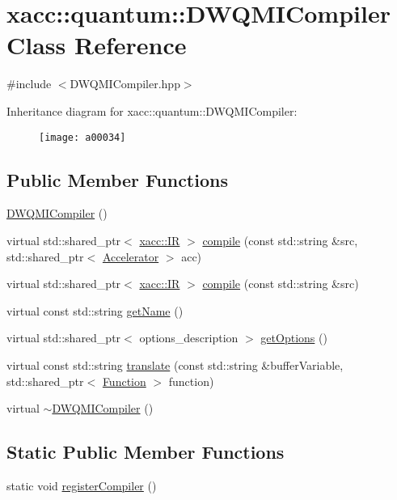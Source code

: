 \hypertarget{a00034}{}\section{xacc\+:\+:quantum\+:\+:D\+W\+Q\+M\+I\+Compiler Class Reference}
\label{a00034}


{\ttfamily \#include $<$D\+W\+Q\+M\+I\+Compiler.\+hpp$>$}

Inheritance diagram for xacc\+:\+:quantum\+:\+:D\+W\+Q\+M\+I\+Compiler\+:\begin{figure}[H]
\begin{center}
\leavevmode
\texttt{[image: a00034]}
\end{center}
\end{figure}
\subsection*{Public Member Functions}
\begin{DoxyCompactItemize}
\item 
\hyperlink{a00034_a1f285f3eaec09363d9439676dbdfbd6a}{D\+W\+Q\+M\+I\+Compiler} ()
\item 
virtual std\+::shared\+\_\+ptr$<$ \hyperlink{a00051}{xacc\+::\+IR} $>$ \hyperlink{a00034_a0df05642f1a6fd44ce7f1c0396d50c9c}{compile} (const std\+::string \&src, std\+::shared\+\_\+ptr$<$ \hyperlink{a00011}{Accelerator} $>$ acc)
\item 
virtual std\+::shared\+\_\+ptr$<$ \hyperlink{a00051}{xacc\+::\+IR} $>$ \hyperlink{a00034_aa22591343b5509bf2c3a5820130ba906}{compile} (const std\+::string \&src)
\item 
virtual const std\+::string \hyperlink{a00034_aed42de96f8e0dd94b6de183f28aee419}{get\+Name} ()
\item 
virtual std\+::shared\+\_\+ptr$<$ options\+\_\+description $>$ \hyperlink{a00034_a0851334cc33b5b1da2694150a0a1a43c}{get\+Options} ()
\item 
virtual const std\+::string \hyperlink{a00034_a56a345539665099329209b3b5f6810c9}{translate} (const std\+::string \&buffer\+Variable, std\+::shared\+\_\+ptr$<$ \hyperlink{a00039}{Function} $>$ function)
\item 
virtual \hyperlink{a00034_a86f9135f7dc1c3246970e2a7f6540b5c}{$\sim$\+D\+W\+Q\+M\+I\+Compiler} ()
\end{DoxyCompactItemize}
\subsection*{Static Public Member Functions}
\begin{DoxyCompactItemize}
\item 
static void \hyperlink{a00034_a421daa5286f31e2b5ab4c141a34c94cd}{register\+Compiler} ()
\end{DoxyCompactItemize}
